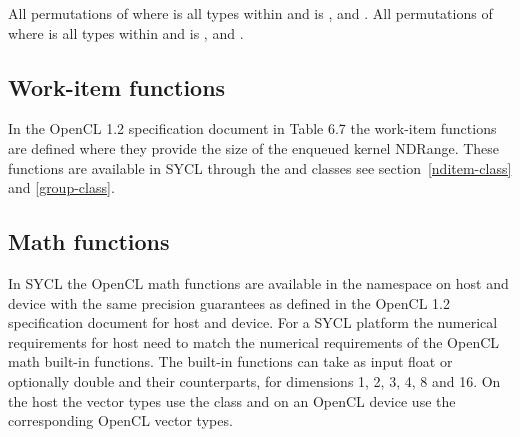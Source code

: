 {
}

{
}
{
  All permutations of  where  is all types within  and  is ,  and .
}
{
    All permutations of  where  is all types within  and  is ,  and .
}
\completeTable

\subsection{Work-item functions}

In the OpenCL 1.2 specification document\cite[ch. 6.12.1]{opencl12} in Table 6.7
the work-item functions are defined where they provide the size of the enqueued
kernel NDRange. These functions are available in SYCL through the
 and  classes see
section~\ref{nditem-class} and \ref{group-class}.

\subsection{Math functions}

In SYCL the OpenCL math functions are available in the namespace
 on host and device with the same precision guarantees as
defined in the OpenCL 1.2 specification document
\cite[ch. 7]{opencl12} for host and device. For a SYCL platform the numerical
requirements for host need to match the numerical requirements of the OpenCL
math built-in functions. The built-in functions can take as input float or
optionally double and their  counterparts, for dimensions 1, 2, 3, 4,
8 and 16. On the host the vector types use the 
class and on an OpenCL device use the corresponding OpenCL
vector types.

